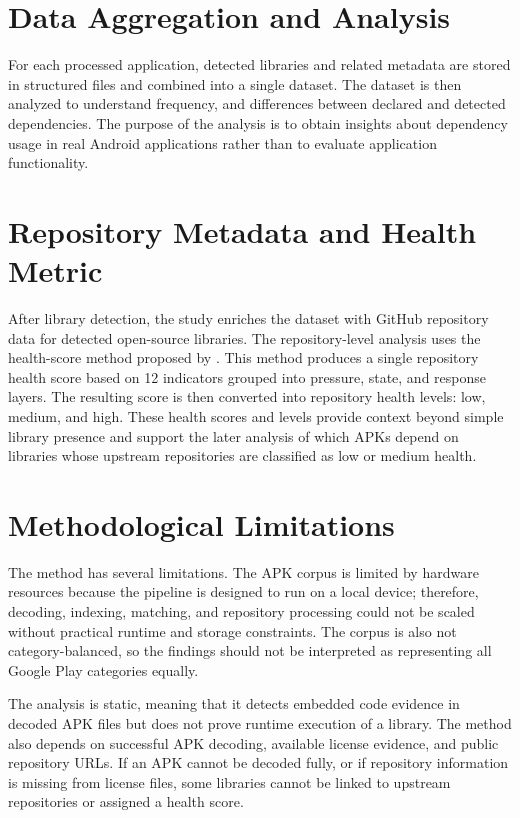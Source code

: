 \documentclass[12pt,a4paper]{report}
\begin{document}
\section{Data Aggregation and Analysis}
For each processed application, detected libraries and related metadata are stored in structured files and combined into a single dataset. The dataset is then analyzed to understand frequency, and differences between declared and detected dependencies. The purpose of the analysis is to obtain insights about dependency usage in real Android applications rather than to evaluate application functionality.

\section{Repository Metadata and Health Metric}

After library detection, the study enriches the dataset with GitHub repository data for detected open-source libraries. The repository-level analysis uses the health-score method proposed by \textcite{wangMethodEvaluateHealth2022}. This method produces a single repository health score based on 12 indicators grouped into pressure, state, and response layers. The resulting score is then converted into repository health levels: low, medium, and high. These health scores and levels provide context beyond simple library presence and support the later analysis of which APKs depend on libraries whose upstream repositories are classified as low or medium health.

\section{Methodological Limitations}
The method has several limitations. The APK corpus is limited by hardware resources because the pipeline is designed to run on a local device; therefore, decoding, indexing, matching, and repository processing could not be scaled without practical runtime and storage constraints. The corpus is also not category-balanced, so the findings should not be interpreted as representing all Google Play categories equally.

The analysis is static, meaning that it detects embedded code evidence in decoded APK files but does not prove runtime execution of a library. The method also depends on successful APK decoding, available license evidence, and public repository URLs. If an APK cannot be decoded fully, or if repository information is missing from license files, some libraries cannot be linked to upstream repositories or assigned a health score.
\end{document}
